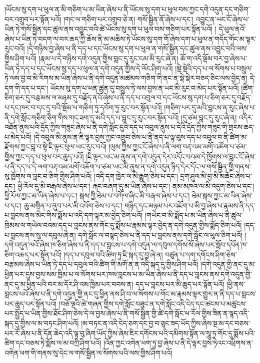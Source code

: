 །ཡོངས་སུ་དག་པ་ཕུལ་ན་མི་གཅིག་པ་མ་ཡིན་ཞེས་པ་ནི་ཡོངས་སུ་དག་པ་ཕུལ་བས་ཀྱང་དགེ་འདུན་དང་གཅིག་བར་འགྲུབ་པར་སྟོན་པའོ། །གང་ལ་གཅིག་པར་འགྲུབ་ཅེ་ན། གསོ་སྦྱིན་ནོ་ཞེས་པ་དང་། འབྱུང་ན་ཡང་ངོ་ཞེས་པ་ཡིན་ཏེ་གསོ་སྦྱིན་དང་ཚུལ་ནས་འབྱུང་བའི་ཚེ་ཡོངས་སུ་དག་པ་ཕུལ་བས་གཅིག་པར་སྟོན་པའོ། །
དེ་ཕུལ་ནའོ་ཞེས་པ་ཡིན་ཏེ་བདག་ལ་བར་ཆད་ཀྱི་ཆོས་ནི་མ་མཆིས་ཏེ་ཡོངས་སུ་དག་གོ་ཞེས་དག་པ་ཕུལ་ན་གདོད་གོང་མ་ལྟར་རུང་བའོ། །དེ་གཉིས་བྱ་ཞེས་པ་ནི་དད་པ་དང་ཡོངས་སུ་དག་པ་ཕུལ་ན་གསོ་སྦྱིན་དང་ཚུལ་ནས་འབྱུང་བའི་ལས་གྱིས་ཤིག་པའོ། །རྣམ་པ་དེ་གཉིས་དགེ་འདུན་གྱིས་བླང་དུ་རུང་ངམ་མི་རུང་ཞེ་ན། ཆོ་ག་འདི་ལྡོམ་བར་བྱ་ཞེས་པ་ཡིན་ཏེ་དད་པ་དང་ཡོངས་སུ་དད་པ་ཕུལ་ན་དགེ་འདུན་གྱིས་དེ་ལོང་ཤིག་པའོ། །སྡེ་སྡེའི་དད་པ་ལ་སོགས་པ་བསྲུལ་ཏེ་ལས་བྱ་བ་མི་རིགས་མ་ཡིན་ཞེས་པ་ནི་དགེ་འདུན་མཚམས་གཅིག་གི་ནང་ན་སྡེ་སྡེར་བཅད་ཅིང་ལས་བྱེད་ན། དེ་དག་གི་དད་པ་དང་། ཡོངས་སུ་དག་པ་ཕན་ཚུན་དུ་བསྲུལ་ཏེ་ལས་བྱས་ན་ཡང་མི་རུང་བ་མེད་པར་སྟོན་པའོ། །ཚིག་ཅིག་ཅར་དུ་བརྩམས་ལ་མཉམ་དུ་བརྗོད་ནའོ་ཞེས་པ་ནི་དད་པ་འབུལ་བ་དང་ཡོངས་སུ་དག་པ་ཅིག་ཅར་དུ་བརྗོད་པ་དང་ཁར་བ་དང་དྲ་བའི་སྡོམ་པ་གཅིག་ཏུ་དབོག་ཏུ་རུང་བར་སྟོན་པའོ། །གཅིག་པར་དུ་མའི་བླངས་ན་རུང་ཞེས་པ་ནི་དགེ་སློང་གཅིག་ཅིག་གིས་གང་ཟག་དུ་མའི་དད་པ་བླང་དུ་རུང་བར་སྟོན་པའོ། །དུ་ཙམ་བླང་དུ་རུང་ཞེ་ན། འདིར་འཐོན་ནུས་པའི་དྲོད་ཀྱིས་གཟུང་ཞེས་པ་ནི་དགེ་སློང་དུའི་དད་པ་འབུལ་ནུས་པ་དེའི་དྲོད་ཀྱིས་གཟུང་གི་གྲངས་ཆད་པ་མེད་པའོ། །དེ་འབུལ་མི་ནུས་ན་ཇི་ལྟར་བྱས་ཀྱང་འགྲུབ་ཅེས་པ་ནི་ནད་པ་ལྟ་བུས་དད་པ་འབུལ་བ་ནི་ཚིག་མ་རྫོགས་ཀྱང་བླ་བ་སྟེ་ཇི་ལྟར་ཕུལ་ཡང་རུང་བའོ། །ལུས་ཀྱིས་ཀྱང་ངོ་ཞེས་པ་ནི་ལག་བརྡ་འམ་མགོ་འཚོག་པ་ཙམ་གྱིས་ཀྱང་དད་པ་ཕུལ་བར་ཆུད་པའོ། །ཇི་ལྟར་ཡང་མ་ནུས་ན་དགེ་འདུན་དེར་འདོང་བའམ་དེ་ཁྱོགས་ལ་བླང་ངོ་ཞེས་པ་ནི་དད་པ་དེ་ལག་བརྡ་འམ་མགོ་འཆོག་པ་ཙམ་ཡང་མི་ནུས་ན་དགེ་འདུན་ཉིད་དེར་དོང་ལ་གསོ་སྦྱིན་གྱི་གནས་སུ་ཁྱོགས་ལ་བླང་བ་ཅིག་གྱིས་ཤིག་པའོ། །འདི་དག་ཁྱེར་ལ་མི་རྒྱུག་ཅེས་པ་དང་། དྲག་ཤུལ་མི་བྱ་མི་མཆོང་ཞེས་པ་དང་། ཕྱི་རོལ་དུ་མི་བརྒལ་ཞེས་པ་དང་། རྐང་བཞག་དུ་མ་ཡིན་ཞེས་པ་དང་། ནམ་མཁའ་ལ་མི་འདུག་ཅེས་པ་དང་། ཕྱི་རོལ་ཀྱང་མ་ཡིན་ཞེས་པ་དང་། སྐས་ཀྱི་ཐེམ་པ་བཀོལ་ཞིང་མི་བརྒལ་ཞེས་པ་དང་། ཐེམ་སྐས་ཀྱང་མ་ཡིན་ཞེས་པ་དང་། ཆུ་མགྲིན་པ་ནུབ་པར་མི་འབོག་ཅེས་པ་དང་། གཉིད་དང་མཉམ་པར་འཇོག་པ་མི་བྱ་ཞེས་པ་རྣམས་ནི་དད་པ་བླངས་ནས་མིང་གིས་སྨོས་པ་འདི་དག་ལྟར་མ་བྱེད་ཅིག་པའོ། །གཡེང་བ་མི་སྨོད་པ་མ་ཡིན་ཞེས་པ་ནི་ཚུལ་ཁྲིམས་ལ་གཡེལ་བའམ་དད་པ་བླངས་ནས་གོང་དུ་སྨོས་པ་རྣམས་ལྟར་བྱེད་ན་དགེ་འདུན་གྱིས་སྨོད་ཅིག་པའོ། །དད་པ་བླངས་ནས་སུ་ལ་དབུལ་ཞེ་ན། དགེ་སློང་ལ་བསྙད་ཅེས་པ་ནི་དད་པ་བླངས་ནས་དགེ་སློང་ལ་ཕུལ་ཅིག་པའོ། །དགེ་འདུན་ལའོ་ཞེས་ཁ་ཅིག་ཞེས་པ་ནི་དད་པ་བླངས་པ་དགེ་འདུན་ལ་དབུལ་དགོས་སོ་ཞེས་པར་སློབ་དཔོན་ཁ་ཅིག་འཆད་པར་སྟོན་པའོ། །དད་པ་དབུལ་བའི་ཚིག་ཏུ་ཇི་སྐད་དུ་བྱ་ཞེ་ན། བཙུན་པ་དག་དགོངས་ཤིག་ཅེས་བརྩམས་ཞེས་པ་ཡིན་ཏེ་དད་པ་དབུལ་བའི་ཚིག་གི་མགོ་ན་ན་འདི་སྐད་དུ་གྱིས་ཤིག་པའོ། །དགེ་འདུན་གྱི་ནང་དུ་མ་ཕྱིན་པར་དུས་བྱས་སམ་ཁྱིམ་པ་ལ་སོགས་པར་ཁས་བླངས་པ་མ་ཡིན་ཞེས་པ་ནི་དད་པ་བླངས་ནས་དགེ་འདུན་གྱི་ནང་དུ་མ་ཕྱིན་པའི་བར་མ་དོར་ཤི་འམ་ཁྱིམ་པར་བབས་ན། དད་པ་བླངས་པར་མི་ཆུད་པར་སྟོན་པའོ། །ཕྱི་ནས་བླངས་པའོ་ཞེས་པ་ནི་དགེ་འདུན་གྱི་ནང་དུ་ཕྱིན་ནས་ཤི་བ་ལ་སོགས་པ་གོང་མ་རྣམས་ལྟར་གྱུར་ན་ནི་དད་པ་བླངས་པར་ཆུད་པར་སྟོན་པའོ། །བཅོ་ལྔའི་ཚེ་གཞན་གྱིས་དགེ་སློང་བཟུང་ན་དགེ་སློང་འདི་ངེད་དང་ཚངས་པ་མཚུངས་པར་སྤྱོད་པ་ཡིན་གྱིས་ཐོང་ཤིག་ཅེས་དེ་ལ་བྱས་ཞེས་པ་ནི་གསོ་སྦྱིན་གྱི་ཚེ་དགེ་སློང་ཕ་རོལ་གྱིས་ཟིན་ན་སྙད་འདི་སྐད་དུ་གྱིས་ལ་མ་བཏང་ཤིག་པའོ། །མ་བཏང་ན་འདི་ངེད་ཅག་དང་བྱ་བ་ཅུང་ཟད་ཡོད་ཀྱིས་ཞེས་སྔ་མ་དང་བཅས་པར་རོ་ཞེས་པ་ནི་དོན་ཆེད་འདི་ལྟ་བུ་ཞིག་ཡོད་ཀྱིས་ཞེས་ཇིར་དགོངས་པའི་དམིགས་སྟོན་ལ་སཱུ་ཏྲ་གོང་དུ་སྨོས་པའི་ཚིག་དང་བཅས་ཏེ་སྨོས་ལ་མ་བཀྲི་ཤིག་པའོ། །འོན་ཀྱང་འགེན་ཕག་ཏུ་བྱ་ཞེས་པ་ནི་དེ་ལྟར་བྱས་ཏེའང་འཕྲིགས་ན་འགེན་ཕག་གི་གནས་སུ་དེང་ལ་གསོ་སྦྱིན་ལ་སོགས་པའི་ལས་གྱིས་ཤིག་པའོ། 